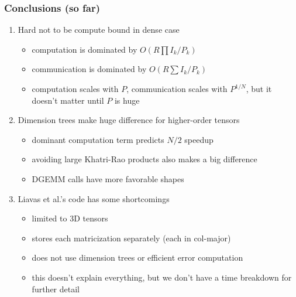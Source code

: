 \documentclass[xcolor=dvipsnames]{beamer}
\begin{document}
\begin{frame}
\frametitle{Conclusions (so far)}

\footnotesize
\begin{enumerate}
	\item Hard not to be compute bound in dense case
	\begin{itemize}
	\scriptsize
		\item computation is dominated by $O(R \prod I_k / P_k)$
		\item communication is dominated by $O(R \sum I_k / P_k)$
		\item computation scales with $P$, communication scales with $P^{1/N}$, but it doesn't matter until $P$ is huge
	\end{itemize}
	\vfill
	\item Dimension trees make huge difference for higher-order tensors
	\begin{itemize}
	\scriptsize
		\item dominant computation term predicts $N/2$ speedup
		\item avoiding large Khatri-Rao products also makes a big difference
		\item DGEMM calls have more favorable shapes
	\end{itemize}
	\vfill
	\item Liavas et al.'s code has some shortcomings
	\begin{itemize}
	\scriptsize
		\item limited to 3D tensors
		\item stores each matricization separately (each in col-major)
		\item does not use dimension trees or efficient error computation
		\item this doesn't explain everything, but we don't have a time breakdown for further detail
	\end{itemize}
\end{enumerate}

\end{frame}
\end{document}
